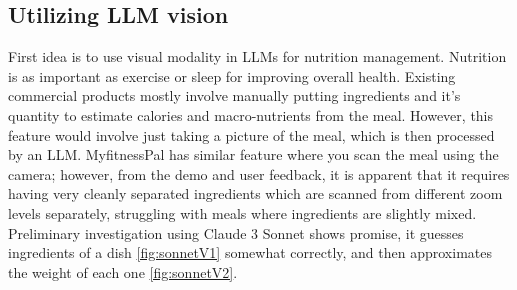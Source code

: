 \subsection{Utilizing LLM vision}
First idea is to use visual modality in LLMs for nutrition management. Nutrition is as important as exercise or sleep for improving overall health. Existing commercial products mostly involve manually putting ingredients and it's quantity to estimate calories and macro-nutrients from the meal. However, this feature would involve just taking a picture of the meal, which is then processed by an LLM. MyfitnessPal has similar feature where you scan the meal using the camera; however, from the demo and user feedback, it is apparent that it requires having very cleanly separated ingredients which are scanned from different zoom levels separately, struggling with meals where ingredients are slightly mixed. Preliminary investigation using Claude 3 Sonnet shows promise, it guesses ingredients of a dish \ref{fig:sonnetV1} somewhat correctly, and then approximates the weight of each one \ref{fig:sonnetV2}.

